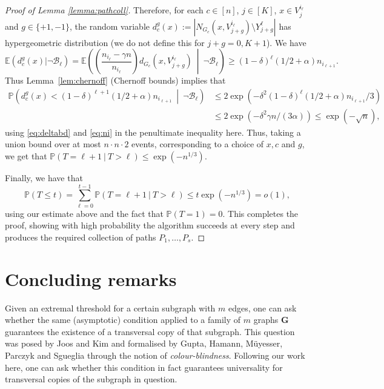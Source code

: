 \documentclass[11pt, dvipsnames]{amsart}
\theoremstyle{plain}
\theoremstyle{definition}
\newcommand{\mc}[1]{\mathcal{#1}}
\newcommand{\mbf}[1]{\mathbf{#1}}
\newcommand{\sm}{\setminus}
\begin{document}
\begin{proof}[Proof of Lemma \ref{lemma:pathcoll}]
Therefore, for each $c \in [n]$, $j \in [K]$, $x \in V_j^{i_\ell}$ and $g \in \{+1,-1\}$, the random variable $d^g_c(x) := |N_{G_c}(x,V^{i_\ell}_{j+g}) \sm Y^\ell_{j+g}|$
has hypergeometric distribution (we do not define this for $j+g=0,K+1$).
We have
    \begin{equation*}
\mathbb{E}(d^g_c(x) | \neg \mc{B}_\ell) = \mathbb{E}\left(\left(\frac{n_{i_\ell}-\gamma n}{n_{i_\ell}}\right)d_{G_c}(x,V^{i_\ell}_{j+g})~ \middle\vert ~\neg \mc{B}_\ell \right)
\geq (1-\delta)^\ell(1/2+\alpha)n_{i_{\ell+1}}.
         \end{equation*}
Thus Lemma~\ref{lem:chernoff} (Chernoff bounds) implies that
 \begin{align*}
\mathbb{P}\left(d^g_c(x) < (1-\delta)^{\ell+1}(1/2+\alpha)n_{i_{\ell+1}} ~\middle\vert~ \neg \mc{B}_\ell\right) 
&\leq 2\exp\left(-\delta^2(1-\delta)^\ell(1/2+\alpha)n_{i_{\ell+1}}/3\right) \\&\leq 2\exp(-\delta^2\gamma n/(3\alpha)) \leq \exp(-\sqrt{n}),
\end{align*} 
using \eqref{eq:deltabd} and \eqref{eq:ni} in the penultimate inequality here.
Thus, taking a union bound over at most $n\cdot n \cdot 2$  events, corresponding to a choice of $x,c$ and $g$, we get that  $\mathbb{P}(T=\ell+1 \ | \ T>\ell) \leq \exp(-n^{1/3})$.

Finally, we have that 
\[\mathbb{P}(T\leq t)=\sum_{\ell=0}^{t-1}\mathbb{P}(T=\ell+1 \ | \ T>\ell)\leq t\exp(-n^{1/3})=o(1),\]
using our estimate above and the fact that $\mathbb{P}(T=1)=0$.  This completes the proof, showing with high probability the algorithm succeeds at every step and produces the required collection of paths $P_1,\ldots,P_s$. 
\end{proof}

\section{Concluding remarks} \label{sec:conclude}

Given an extremal threshold for a certain subgraph with $m$ edges, one can ask whether the same (asymptotic) condition applied to a family of $m$ graphs $\mbf G$ guarantees the existence of a transversal copy of that subgraph. This question was posed by Joos and Kim \cite{jooskim} and formalised by Gupta, Hamann, M\"uyesser, Parczyk and Sgueglia \cite{ghmps} through the notion of \emph{colour-blindness}. Following our work here, one can ask whether this condition in fact guarantees universality for transversal copies of the subgraph in question.
\end{document}
